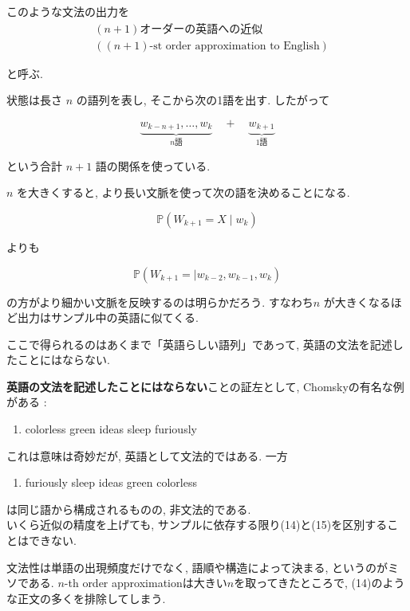\documentclass[dvipdfmx, xcolor={dvipsnames},12pt]{beamer}
\begin{document}
\begin{frame}
このような文法の出力を
\begin{align*}
&(n+1)\text{オーダーの英語への近似}\\
&\left((n+1)\text{-st order approximation to English}\right)
\end{align*}

と呼ぶ.

\begin{marker}
状態は長さ \(n\) の語列を表し, そこから次の1語を出す.
したがって

\[
\underbrace{w_{k-n+1},\dots,w_k}_{n\text{語}}
\quad + \quad
\underbrace{w_{k+1}}_{1\text{語}}
\]

という合計 \(n+1\) 語の関係を使っている.
\end{marker}
\end{frame}

\begin{frame}
\(n\) を大きくすると, より長い文脈を使って次の語を決めることになる.

\[
\mathbb{P}(W_{k+1} = X \mid w_k)
\]

よりも

\[
\mathbb{P}(W_{k+1} = \mid w_{k-2},w_{k-1},w_k)
\]

の方がより細かい文脈を反映するのは明らかだろう. すなわち\(n\) が大きくなるほど出力はサンプル中の英語に似てくる.

\begin{marker}
ここで得られるのはあくまで「英語らしい語列」であって, 英語の文法を記述したことにはならない.
\end{marker}
\end{frame}

\begin{frame}
\textbf{英語の文法を記述したことにはならない}ことの証左として, Chomskyの有名な例がある :

\begin{enumerate}
\item[(14)] colorless green ideas sleep furiously
\end{enumerate}
これは意味は奇妙だが, 英語として文法的ではある. 一方

\begin{enumerate}
\item[(15)] furiously sleep ideas green colorless
\end{enumerate}
は同じ語から構成されるものの, 非文法的である. \\
いくら近似の精度を上げても, サンプルに依存する限り(14)と(15)を区別することはできない.

\begin{marker}
文法性は単語の出現頻度だけでなく, 語順や構造によって決まる, というのがミソである. $n$-th order approximationは大きい$n$を取ってきたところで, (14)のような正文の多くを排除してしまう.
\end{marker}
\end{frame}
\end{document}
